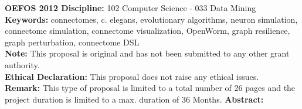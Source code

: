 \documentclass[a4paper,11pt]{article}
\begin{document}
%
%
{\bf OEFOS 2012 Discipline:} 102 Computer Science - 033  Data Mining 
\\[0,2cm]
{\bf Keywords:} connectomes, c. elegans, evolutionary algorithms, neuron simulation, connectome simulation, connectome visualization, OpenWorm, graph resilience, graph perturbation, connectome DSL
\\[0,2cm]
{\bf Note:} This proposal is original and has not been submitted to any other grant authority.
\\[0,2cm]
{\bf Ethical Declaration:} This proposal does not raise any ethical issues.
\\[0,2cm]
{\bf Remark:} This type of proposal is limited to a total number of 26 pages and the project duration is limited to a max. duration of 36 Months.
\newpage
%
%
{\bf Abstract:}
\\[0,2cm]
\end{document}
